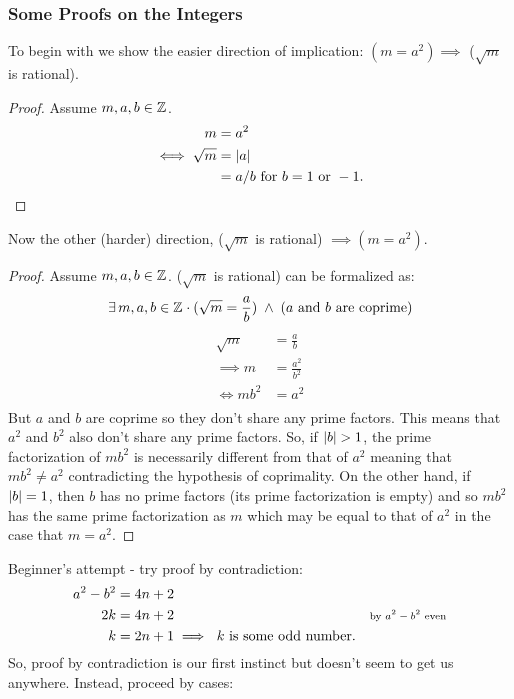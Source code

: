 \documentclass[../MathsNotesBase.tex]{subfiles}
\begin{document}
{		\subsubsection{Some Proofs on the Integers}\bigskip
	
		To begin with we show the easier direction of implication: $(m = a^2) \implies$ ($\sqrt{m}$ is rational).
		\begin{proof}
		Assume $m,a,b \in \mathbb{Z}^{}$.
		\begin{align*}
		m &= a^2 \\
		\iff \sqrt{m} &= \left\lvert a\right\rvert \\
		&= a/b \text{ for } b = 1 \text{ or } -1. \qedhere
		\end{align*}
		\end{proof}
		Now the other (harder) direction, ($\sqrt{m}$ is rational) $\implies (m = a^2)$.
		\begin{proof}
		Assume $m,a,b \in \mathbb{Z}^{}$. ($\sqrt{m}$ is rational) can be formalized as:
		\[ \exists\,m,a,b \in \mathbb{Z}^{} \cdot (\sqrt{m} = \frac{a}{b}) \; \wedge \; \text{($a$ and $b$ are coprime)} \]
		\begin{align*}
		\sqrt{m} &= \frac{a}{b} \\[8pt]
		\implies m &= \frac{a^2}{b^2} \\[8pt]
		\iff mb^2 &= a^2 \\ 
		\end{align*}
		But $a$ and $b$ are coprime so they don't share any prime factors. This means that $a^2$ and $b^2$ also don't share any prime factors. So, if $\left\lvert b\right\rvert > 1$, the prime factorization of $mb^2$ is necessarily different from that of $a^2$ meaning that $mb^2 \neq a^2$ contradicting the hypothesis of coprimality.
		On the other hand, if $\left\lvert b\right\rvert = 1$, then $b$ has no prime factors (its prime factorization is empty) and so $mb^2$ has the same prime factorization as $m$ which may be equal to that of $a^2$ in the case that $m = a^2$.
		\end{proof}
		\bigskip
		
		\bigskip
		Beginner's attempt - try proof by contradiction:
		\begin{align*}
		a^2 - b^2 &= 4n + 2 \\
		2k &= 4n + 2 &\text{\scriptsize{by $a^2 - b^2$ even}}\\
		k &= 2n + 1 \implies \text{ $k$ is some odd number.}
		\end{align*}
		So, proof by contradiction is our first instinct but doesn't seem to get us anywhere.
		Instead, proceed by cases:
}
\end{document}
